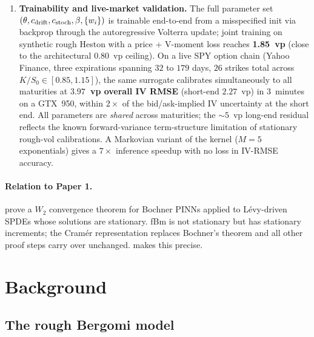 \documentclass[11pt,a4paper]{article}
\begin{document}
\begin{enumerate}
 \item \textbf{Trainability and live-market validation.}
  The full parameter set $(\theta, c_{\rm drift}, c_{\rm stoch}, \beta,
  \{w_i\})$ is trainable end-to-end from a misspecified init via
  backprop through the autoregressive Volterra update; joint training
  on synthetic rough Heston with a price + V-moment loss reaches
  \textbf{1.85~vp} (close to the architectural $0.80$~vp ceiling).
  On a live SPY option chain (Yahoo Finance, three expirations spanning
  $32$ to $179$ days, $26$ strikes total across $K/S_0 \in [0.85, 1.15]$),
  the same surrogate calibrates simultaneously to all maturities at
  \textbf{$3.97$~vp overall IV RMSE} (short-end $2.27$~vp) in
  $3$~minutes on a GTX~950, within $2\times$ of the bid/ask-implied
  IV uncertainty at the short end. All parameters are \emph{shared}
  across maturities; the $\sim\!5$~vp long-end residual reflects the
  known forward-variance term-structure limitation of stationary
  rough-vol calibrations. A Markovian variant
  of the kernel ($M = 5$ exponentials) gives a $7\times$ inference
  speedup with no loss in IV-RMSE accuracy.
\end{enumerate}

\paragraph{Relation to Paper 1.} \citet{TODO-paper1} prove a $W_2$
convergence theorem for Bochner PINNs applied to Lévy-driven SPDEs whose
solutions are stationary. fBm is not stationary but has stationary
increments; the Cramér representation replaces Bochner's theorem and all
other proof steps carry over unchanged.  makes this
precise.

\section{Background}
\label{sec:background}

\subsection{The rough Bergomi model}
\end{document}
